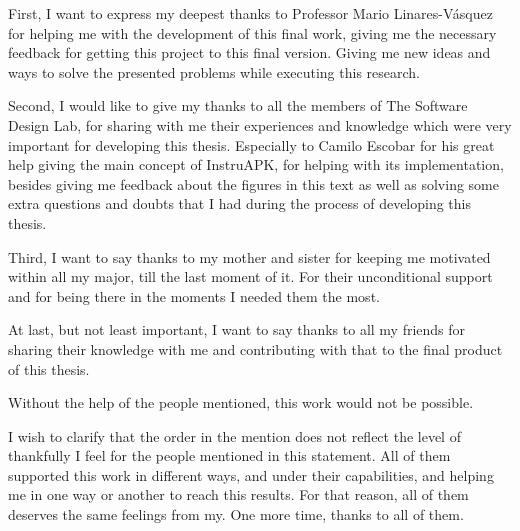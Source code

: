 \documentclass[
12pt, %
english, %
onehalfspacing, %
nolistspacing, %
liststotoc, %
parskip, %
headsepline, %
consistentlayout, %
]{MastersDoctoralThesis} %
\begin{document}
\begin{acknowledgements}
\addchaptertocentry{\acknowledgementname} %

First, I want to express my deepest thanks to Professor Mario Linares-Vásquez for helping me with the development of this final work, giving me the necessary feedback for getting this project to this final version. Giving me new ideas and ways to solve the presented problems while executing this research.

Second, I would like to give my thanks to all the members of The Software Design Lab, for sharing with me their experiences and knowledge which were very important for developing this thesis. Especially to Camilo Escobar for his great help giving the main concept of InstruAPK, for helping with its implementation, besides giving me feedback about the figures in this text as well as solving some extra questions and doubts that I had during the process of developing this thesis.

Third, I want to say thanks to my mother and sister for keeping me motivated within all my major, till the last moment of it. For their unconditional support and for being there in the moments I needed them the most. 

At last, but not least important, I want to say thanks to all my friends for sharing their knowledge with me and contributing with that to the final product of this thesis. 

Without the help of the people mentioned, this work would not be possible.

I wish to clarify that the order in the mention does not reflect the level of thankfully I feel for the people mentioned in this statement. All of them supported this work in different ways, and under their capabilities, and helping me in one way or another to reach this results. For that reason, all of them deserves the same feelings from my. One more time, thanks to all of them.
\end{acknowledgements}


\tableofcontents %

\listoffigures %

\listoftables %
\end{document}
